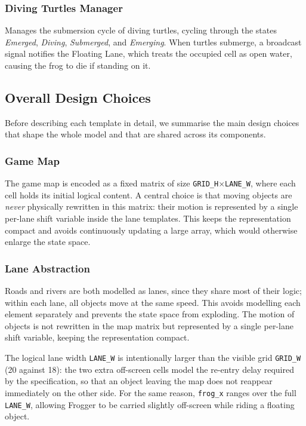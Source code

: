 \documentclass[a4paper]{article}
\begin{document}
\subsubsection*{Diving Turtles Manager}
Manages the submersion cycle of diving turtles, cycling through the states 
\textit{Emerged}, \textit{Diving}, \textit{Submerged}, and \textit{Emerging}. 
When turtles submerge, a broadcast signal notifies the Floating Lane, 
which treats the occupied cell as open water, causing the frog to die if standing on it.


\subsection{Overall Design Choices}
Before describing each template in detail, we summarise the main design 
choices that shape the whole model and that are shared across its components.

\subsubsection*{Game Map}
The game map is encoded as a fixed matrix of size \texttt{GRID\_H}$\times$\texttt{LANE\_W}, 
where each cell holds its initial logical content. A central choice is that moving objects are \textit{never} 
physically rewritten in this matrix: their motion is represented by a single 
per-lane shift variable inside the lane templates. This keeps the 
representation compact and avoids continuously updating a large array, which 
would otherwise enlarge the state space.

\subsubsection*{Lane Abstraction}
Roads and rivers are both modelled as lanes, since they share most of their
logic; within each lane, all objects move at the same speed. This avoids
modelling each element separately and prevents the state space from
exploding. The motion of objects is not rewritten in the map matrix 
but represented by a single per-lane shift variable, keeping the 
representation compact.

The logical lane width \texttt{LANE\_W} is intentionally larger than the 
visible grid \texttt{GRID\_W} (20 against 18): the two extra off-screen cells 
model the re-entry delay required by the specification, so that an object 
leaving the map does not reappear immediately on the other side. For the same 
reason, \texttt{frog\_x} ranges over the full \texttt{LANE\_W}, allowing 
Frogger to be carried slightly off-screen while riding a floating object.
\end{document}
